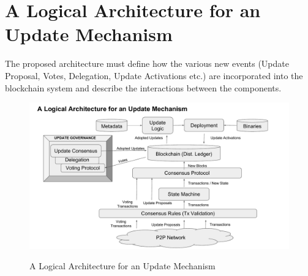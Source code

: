 \section{A Logical Architecture for an Update Mechanism}
The proposed architecture must define how the various new events (Update Proposal, Votes, Delegation, Update Activations etc.) are incorporated into the blockchain system and describe the interactions between the components.

\begin{figure}[H]
    \caption{A Logical Architecture for an Update Mechanism}
    \centering
    \includegraphics[width=0.9 \columnwidth,keepaspectratio]{figures/logical_architecture.pdf}
    \label{fig.sequence}
\end{figure}
